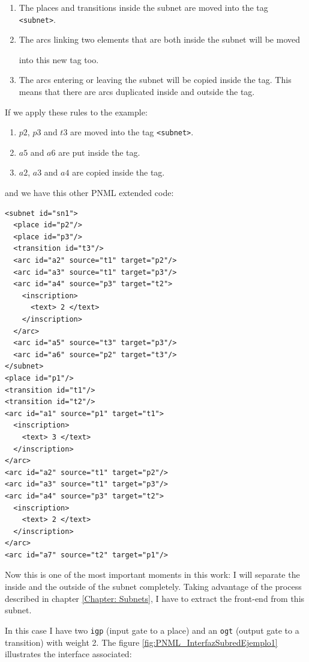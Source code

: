 \begin{enumerate}
\item The places and transitions inside the subnet are moved into the tag
\texttt{<subnet>}.
\item The arcs linking two elements that are both inside the subnet will be moved

 into this new tag too.
\item The arcs entering or leaving the subnet will be copied inside the tag.
This means that there are arcs duplicated inside and outside the tag.
\end{enumerate}


If we apply these rules to the example:

\begin{enumerate}
\item $p2$, $p3$ and $t3$ are moved into the tag \texttt{<subnet>}.
\item $a5$ and $a6$ are put inside the tag.
\item $a2$, $a3$ and $a4$ are copied inside the tag.
\end{enumerate}

and we have this other PNML extended code: 

\begin{lstlisting}
<subnet id="sn1">
  <place id="p2"/>
  <place id="p3"/>
  <transition id="t3"/>
  <arc id="a2" source="t1" target="p2"/>
  <arc id="a3" source="t1" target="p3"/>
  <arc id="a4" source="p3" target="t2">
    <inscription>
      <text> 2 </text>
    </inscription>
  </arc>
  <arc id="a5" source="t3" target="p3"/>
  <arc id="a6" source="p2" target="t3"/>
</subnet>
<place id="p1"/>
<transition id="t1"/>
<transition id="t2"/>
<arc id="a1" source="p1" target="t1">
  <inscription>
    <text> 3 </text>
  </inscription>
</arc>
<arc id="a2" source="t1" target="p2"/>
<arc id="a3" source="t1" target="p3"/>
<arc id="a4" source="p3" target="t2">
  <inscription>
    <text> 2 </text>
  </inscription>
</arc>
<arc id="a7" source="t2" target="p1"/>
\end{lstlisting}

Now this is one of the most important moments in this work: I will separate the inside
and the outside of the subnet completely. Taking advantage of the process described in chapter \ref{Chapter: Subnets}, I have to extract the front-end from this subnet.

In this case I have two \texttt{igp} (input gate to a place) and an \texttt{ogt} (output gate to a transition) with weight 2. The figure \ref{fig:PNML_InterfazSubredEjemplo1} illustrates the interface associated:

